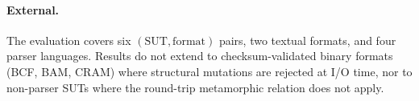 \paragraph{External.}
The evaluation covers six $(\mathrm{SUT}, \mathrm{format})$ pairs,
two textual formats, and four parser languages. Results do not
extend to checksum-validated binary formats (BCF, BAM, CRAM) where
structural mutations are rejected at I/O time, nor to non-parser
SUTs where the round-trip metamorphic relation does not apply.
